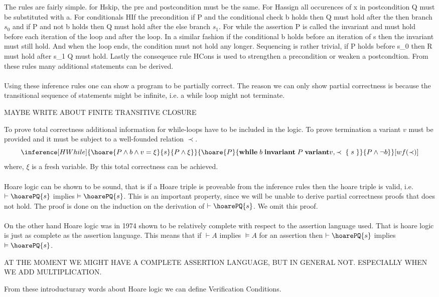 The rules are fairly simple. for Hskip, the pre and postcondition must be the same.
For Hassign all occurences of x in postcondition Q must be substituted with a.
For conditionals HIf the precondition if P and the conditional check b holds then Q must hold after the then branch $s_{0}$ and if P and not b holds then Q must hold after the else branch $s_1$.
For while the assertion P is called the invariant and must hold before each iteration of the loop and after the loop. In a similar fashion if the conditional b holds before an iteration of s then the invariant must still hold. And when the loop ends, the condition must not hold any longer.
Sequencing is rather trivial, if P holds before s_0 then R must hold after s_1 Q must hold.
Lastly the conseqeuce rule HCons is used to strengthen a precondition or weaken a postcondtion.
From these rules many additional statements can be derived.
\\~\\
Using these inference rules one can show a program to be partially correct.
The reason we can only show partial correctness is because the transitional sequence of statements might be infinite, i.e. a while loop might not terminate.

MAYBE WRITE ABOUT FINITE TRANSITIVE CLOSURE

To prove total correctness additional information for while-loops have to be included in the logic.
To prove termination a variant $v$ must be provided and it must be subject to a well-founded relation $\prec$.
\[
\inference[HWhile]{\hoare{P \wedge b \wedge v = \xi }{s}{P \wedge \xi}}
{\hoare{P}{ \mathbf{while} \; b \; \mathbf{invariant} \; P \; \mathbf{variant} v, \prec \; \{ \; s \; \} }{P \wedge \neg b}}[wf(\prec)]
\]
where, $\xi$ is a fresh variable. By this total correctness can be achieved.
\\~\\
Hoare logic can be shown to be sound, that is if a Hoare triple is proveable from the inference rules then the hoare triple is valid, i.e. $\vdash \hoarePQ{s}$ implies $\vDash \hoarePQ{s}$. This is an important
property, since we will be unable to derive partial correctness proofs that does not hold. The proof is done on the induction on the derivation of $\vdash \hoarePQ{s}$. We omit this proof.
\\~\\
On the other hand Hoare logic was in 1974\cite{} shown to be relatively complete with respect to the assertion language used. That is hoare logic is just as complete as the assertion language. This means that if
$\vdash A$ implies $\vDash A$ for an assertion then $\vdash \hoarePQ{s}$ implies $\vDash \hoarePQ{s}$.

AT THE MOMENT WE MIGHT HAVE A COMPLETE ASSERTION LANGUAGE, BUT IN GENERAL NOT. ESPECIALLY WHEN WE ADD MULTIPLICATION.

From these introducturary words about Hoare logic we can define Verification Conditions.

